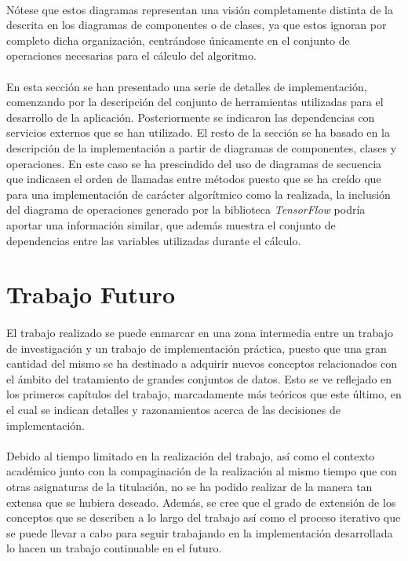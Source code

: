 \documentclass{subfiles}
\begin{document}
          \paragraph{}
          Nótese que estos diagramas representan una visión completamente distinta de la descrita en los diagramas de componentes o de clases, ya que estos ignoran por completo dicha organización, centrándose únicamente en el conjunto de operaciones necesarias para el cálculo del algoritmo.

      \paragraph{}
      En esta sección se han presentado una serie de detalles de implementación, comenzando por la descripción del conjunto de herramientas utilizadas para el desarrollo de la aplicación. Posteriormente se indicaron las dependencias con servicios externos que se han utilizado. El resto de la sección se ha basado en la descripción de la implementación a partir de diagramas de componentes, clases y operaciones. En este caso se ha prescindido del uso de diagramas de secuencia que indicasen el orden de llamadas entre métodos puesto que se ha creído que para una implementación de carácter algorítmico como la realizada, la inclusión del diagrama de operaciones generado por la biblioteca \emph{TensorFlow} podría aportar una información similar, que además muestra el conjunto de dependencias entre las variables utilizadas durante el cálculo.

    \section{Trabajo Futuro}
    \label{sec:future_work}

      \paragraph{}
      El trabajo realizado se puede enmarcar en una zona intermedia entre un trabajo de investigación y un trabajo de implementación práctica, puesto que una gran cantidad del mismo se ha destinado a adquirir nuevos conceptos relacionados con el ámbito del tratamiento de grandes conjuntos de datos. Esto se ve reflejado en los primeros capítulos del trabajo, marcadamente más teóricos que este último, en el cual se indican detalles y razonamientos acerca de las decisiones de implementación.

      \paragraph{}
      Debido al tiempo limitado en la realización del trabajo, así como el contexto académico junto con la compaginación de la realización al mismo tiempo que con otras asignaturas de la titulación, no se ha podido realizar de la manera tan extensa que se hubiera deseado. Además, se cree que el grado de extensión de los conceptos que se describen a lo largo del trabajo así como el proceso iterativo que se puede llevar a cabo para seguir trabajando en la implementación desarrollada lo hacen un trabajo continuable en el futuro.
\end{document}
